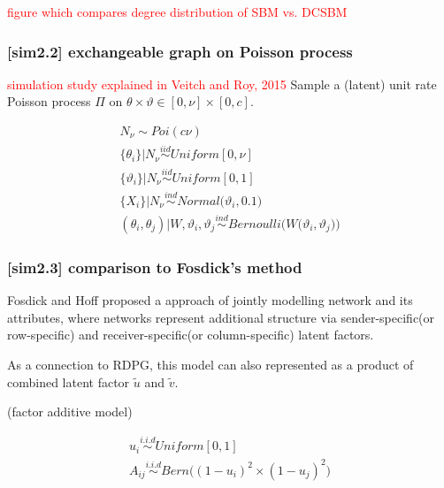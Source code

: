\documentclass[12pt]{article}
\theoremstyle{definition}
\begin{document}
\textcolor{red}{figure which compares degree distribution of SBM vs. DCSBM}



\subsubsection{[sim2.2] exchangeable graph on Poisson process}


\textcolor{red}{simulation study explained in Veitch and Roy, 2015}
Sample a (latent) unit rate Poisson process $\Pi$ on $\theta \times \vartheta \in [0, \nu] \times [0, c]$.
 
\begin{equation}
\begin{gathered}
N_{\nu} \sim Poi( c \nu) \\ 
\{ \theta_{i} \} \big| N_{\nu} \overset{iid}{\sim} Uniform[0, \nu]  \\ 
\{ \vartheta_{i} \} \big| N_{\nu} \overset{iid}{\sim} Uniform[0,1] \\ 
\{ X_{i}  \} | N_{\nu} \overset{ind}{\sim} Normal \big( \vartheta_{i}, 0.1 \big)  \\ 
(\theta_{i}, \theta_{j}) \big| W, \vartheta_{i}, \vartheta_{j} \overset{ind}{\sim} Bernoulli \big( W\big( \vartheta_{i}, \vartheta_{j} \big) \big) 
\end{gathered}
\end{equation}





\subsubsection{[sim2.3] comparison to Fosdick's method}


Fosdick and Hoff proposed a approach of jointly modelling network and its attributes, where networks represent additional structure via sender-specific(or row-specific) and receiver-specific(or column-specific) latent factors.

As a connection to RDPG, this model can also represented as a product of combined latent factor $\tilde{u}$ and $\tilde{v}$. 

(factor additive model)

\begin{equation}
\begin{gathered}
u_{i} \overset{i.i.d}{\sim} Uniform[0,1] \\ 
A_{ij}  \overset{i.i.d}{\sim} Bern \big(  ( 1 - u_{i})^2 \times (1 - u_{j})^2    \big)
\end{gathered}
\end{equation}
\end{document}
